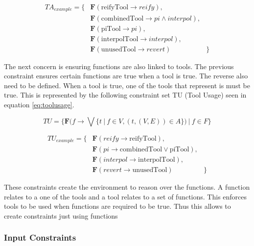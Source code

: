 \documentclass{article}
\begin{document}
\begin{align*}
    TA_{example} = \{& \textbf{F}( \text{reifyTool} \rightarrow reify), &\\
    & \textbf{F}( \text{combinedTool} \rightarrow pi \wedge interpol), &\\
    & \textbf{F}( \text{piTool} \rightarrow pi), &\\
    & \textbf{F}( \text{interpolTool} \rightarrow interpol), &\\
    &\textbf{F}( \text{unusedTool} \rightarrow revert) & \}
\end{align*}

The next concern is ensuring functions are also linked to tools. The previous constraint ensures certain functions are true when a tool is true. The reverse also need to be defined. When a tool is true, one of the tools that represent is must be true. This is represented by the following constraint set TU (Tool Usage) seen in equation \ref{eq:toolusage}.

\begin{equation}
    TU =  \{  \textbf{F} ( f \rightarrow \bigvee \{ t\ |\ f \in V, (t,(V,E))  \in A  \} )\ |\ f \in F \} \label{eq:toolusage}
\end{equation}

\begin{align*}
    TU_{example}= \{&\textbf{F} (reify \rightarrow \text{reifyTool}), &\\
    &\textbf{F} (pi \rightarrow \text{combinedTool} \vee \text{piTool}), &\\
    &\textbf{F} (interpol  \rightarrow \text{interpolTool}),& \\
    &\textbf{F} (revert  \rightarrow \text{unusedTool}) &\} 
\end{align*}

These constraints create the environment to reason over the functions. A function relates to a one of the tools and a tool relates to a set of functions. This enforces tools to be used when functions are required to be true. Thus this allows to create constraints just using functions

\subsubsection{Input Constraints}

\end{document}

